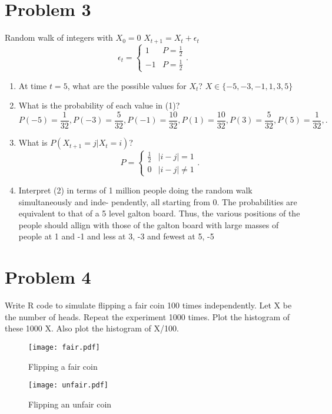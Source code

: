 \documentclass{article}
\begin{document}
    \section{Problem 3}
    Random walk of integers with $X_0=0$ $X_{t+1} = X_t + \epsilon_t$\[
    \epsilon_t = 
   \begin{cases}
       1 & P = \frac{1}{2} \\
       -1 & P = \frac{1}{2}
   \end{cases}
    .\] 
    \begin{enumerate}
        \item At time $t=5$, what are the possible values for $X_t$?
            $X \in \{-5,-3,-1,1,3,5\}$
        \item What is the probability of each value in (1)?
             \[
            P(-5) = \frac{1}{32},
            P(-3) = \frac{5}{32},
            P(-1) = \frac{10}{32},
            P(1) = \frac{10}{32},
            P(3) = \frac{5}{32},
            P(5) = \frac{1}{32},
            .\] 
        \item What is $P(X_{t+1} = j| X_t = i)$?
            \[
            P = 
            \begin{cases}
                \frac{1}{2} & |i-j| = 1 \\
                0 & |i-j| \ne 1
            \end{cases}
            .\]
        \item  Interpret (2) in terms of 1 million people doing the random walk simultaneously and inde-
            pendently, all starting from 0.
            The probabilities are equivalent to that of a 5 level galton board. Thus, the various positions of the people
            should allign with those of the galton board with large masses of people at 1 and -1 and less at 3, -3 and fewest at 5, -5
            
            
    \end{enumerate}
   \section{Problem 4}
   Write R code to simulate flipping a fair coin 100 times independently. Let X be the
number of heads. Repeat the experiment 1000 times. Plot the histogram of these 1000 X. Also
plot the histogram of X/100.
    \begin{figure}[htbp]
      \centering
      \texttt{[image: fair.pdf]}
      \caption{Flipping a fair coin}
      \label{fig:histogram}
    \end{figure}
    \begin{figure}[htbp]
      \centering
      \texttt{[image: unfair.pdf]}
      \caption{Flipping an unfair coin}
      \label{fig:histogram}
    \end{figure}
\end{document}
